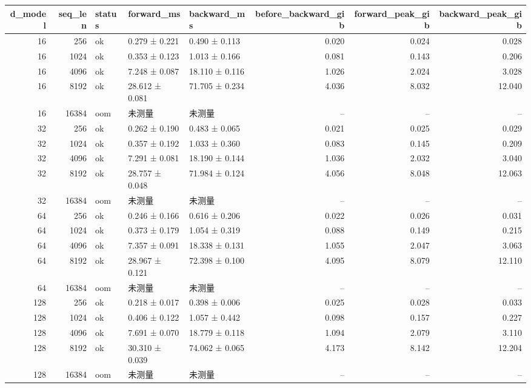 \begin{tabular}{rrlllrrr}
\toprule
d\_model & seq\_len & status & forward\_ms & backward\_ms & before\_backward\_gib & forward\_peak\_gib & backward\_peak\_gib \\
\midrule
16 & 256 & ok & 0.279 ± 0.221 & 0.490 ± 0.113 & 0.020 & 0.024 & 0.028 \\
16 & 1024 & ok & 0.353 ± 0.123 & 1.013 ± 0.166 & 0.081 & 0.143 & 0.206 \\
16 & 4096 & ok & 7.248 ± 0.087 & 18.110 ± 0.116 & 1.026 & 2.024 & 3.028 \\
16 & 8192 & ok & 28.612 ± 0.081 & 71.705 ± 0.234 & 4.036 & 8.032 & 12.040 \\
16 & 16384 & oom & 未测量 & 未测量 & -- & -- & -- \\
32 & 256 & ok & 0.262 ± 0.190 & 0.483 ± 0.065 & 0.021 & 0.025 & 0.029 \\
32 & 1024 & ok & 0.357 ± 0.192 & 1.033 ± 0.360 & 0.083 & 0.145 & 0.209 \\
32 & 4096 & ok & 7.291 ± 0.081 & 18.190 ± 0.144 & 1.036 & 2.032 & 3.040 \\
32 & 8192 & ok & 28.757 ± 0.048 & 71.984 ± 0.124 & 4.056 & 8.048 & 12.063 \\
32 & 16384 & oom & 未测量 & 未测量 & -- & -- & -- \\
64 & 256 & ok & 0.246 ± 0.166 & 0.616 ± 0.206 & 0.022 & 0.026 & 0.031 \\
64 & 1024 & ok & 0.373 ± 0.179 & 1.054 ± 0.319 & 0.088 & 0.149 & 0.215 \\
64 & 4096 & ok & 7.357 ± 0.091 & 18.338 ± 0.131 & 1.055 & 2.047 & 3.063 \\
64 & 8192 & ok & 28.967 ± 0.121 & 72.398 ± 0.100 & 4.095 & 8.079 & 12.110 \\
64 & 16384 & oom & 未测量 & 未测量 & -- & -- & -- \\
128 & 256 & ok & 0.218 ± 0.017 & 0.398 ± 0.006 & 0.025 & 0.028 & 0.033 \\
128 & 1024 & ok & 0.406 ± 0.122 & 1.057 ± 0.442 & 0.098 & 0.157 & 0.227 \\
128 & 4096 & ok & 7.691 ± 0.070 & 18.779 ± 0.118 & 1.094 & 2.079 & 3.110 \\
128 & 8192 & ok & 30.310 ± 0.039 & 74.062 ± 0.065 & 4.173 & 8.142 & 12.204 \\
128 & 16384 & oom & 未测量 & 未测量 & -- & -- & -- \\
\bottomrule
\end{tabular}

